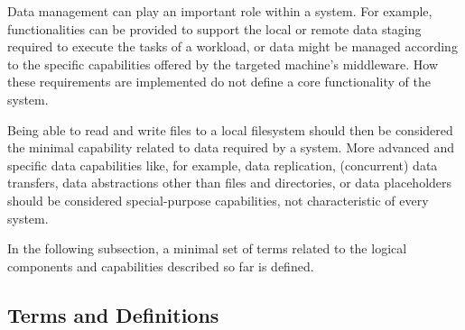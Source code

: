 \documentclass{sig-alternate}
\begin{document}

Data management can play an important role within a \pilotjob system. For
example, functionalities can be provided to support the local or remote data
staging required to execute the tasks of a workload, or data might be managed
according to the specific capabilities offered by the targeted machine's
middleware. How these requirements are implemented do not define a core
functionality of the \pilot system.


Being able to read and write files to a local filesystem should then be
considered the minimal capability related to data required by a \pilotjob
system. More advanced and specific data capabilities like, for example, data
replication, (concurrent) data transfers, data abstractions other than files and
directories, or data placeholders should be considered special-purpose
capabilities, not characteristic of every \pilotjob system.


In the following subsection, a minimal set of terms related to the logical
components and capabilities described so far is defined.

\subsection{Terms and Definitions}
\label{sec:termsdefs}
\end{document}
